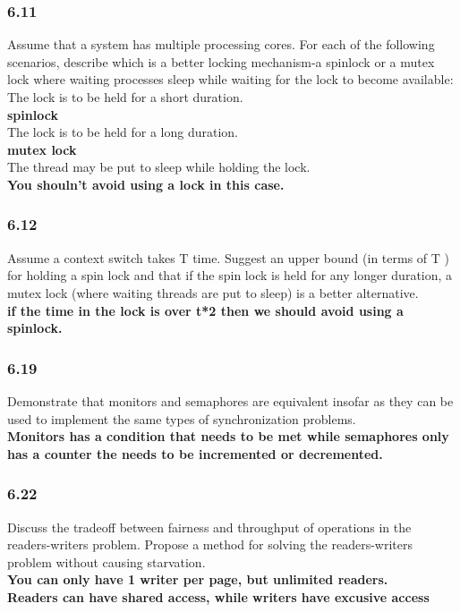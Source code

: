 \documentclass[a4paper,10pt,titlepage]{report}
\begin{document}
\subsubsection{6.11}
Assume that a system has multiple processing cores. For each of the following scenarios, describe which is a better locking mechanism-a spinlock or a mutex lock where waiting processes sleep while waiting for the lock to become available:\\
The lock is to be held for a short duration.\\
\textbf{spinlock}\\
The lock is to be held for a long duration.\\
\textbf{mutex lock}\\
The thread may be put to sleep while holding the lock.\\
\textbf{You shouln't avoid using a lock in this case.}

\subsubsection{6.12}
Assume a context switch takes T time. Suggest an upper bound (in terms of T ) for holding a spin lock and that if the spin lock is held for any longer duration, a mutex lock (where waiting threads are put to sleep) is a better alternative.\\
\textbf{if the time in the lock is over t*2 then we should avoid using a spinlock.}
\subsubsection{6.19} Demonstrate that monitors and semaphores are equivalent insofar as they can be used to implement the same types of synchronization problems.\\
\textbf{Monitors has a condition that needs to be met while semaphores only has a counter the needs to be incremented or decremented.}

\subsubsection{6.22} Discuss the tradeoff between fairness and throughput of operations in the readers-writers problem. Propose a method for solving the readers-writers problem without causing starvation.\\
\textbf{
You can only have 1 writer per page, but unlimited readers.\\
Readers can have shared access, while writers have excusive access\\
}
\end{document}
